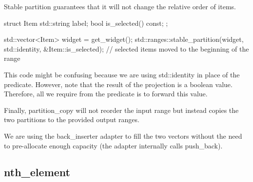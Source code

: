Stable partition guarantees that it will not change the relative order of items.



\begin{box-note}
\begin{cppcode}
struct Item {
    std::string label;
    bool is_selected() const;
};

std::vector<Item> widget = get_widget();
std::ranges::stable_partition(widget, std::identity{}, &Item::is_selected);
// selected items moved to the beginning of the range
\end{cppcode}
\end{box-note}

This code might be confusing because we are using std::identity in place of the predicate. However, note that the result of the projection is a boolean value. Therefore, all we require from the predicate is to forward this value.

Finally, partition\_copy will not reorder the input range but instead copies the two partitions to the provided output ranges.



\begin{box-note}
\end{box-note}

We are using the back\_inserter adapter to fill the two vectors without the need to pre-allocate enough capacity (the adapter internally calls push\_back).

\subsection{nth\_element}


